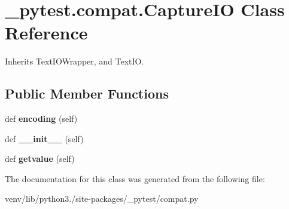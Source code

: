 \hypertarget{class__pytest_1_1compat_1_1_capture_i_o}{}\section{\+\_\+pytest.\+compat.\+Capture\+IO Class Reference}
\label{class__pytest_1_1compat_1_1_capture_i_o}


Inherits Text\+I\+O\+Wrapper, and Text\+IO.

\subsection*{Public Member Functions}
\begin{DoxyCompactItemize}
\item 
\mbox{\label{class__pytest_1_1compat_1_1_capture_i_o_aa5b773ce277fa3dbbabae4387d5d6e75}} 
def {\bfseries encoding} (self)
\item 
\mbox{\label{class__pytest_1_1compat_1_1_capture_i_o_a6636b919070398ff6c7182ad1b5702f5}} 
def {\bfseries \+\_\+\+\_\+init\+\_\+\+\_\+} (self)
\item 
\mbox{\label{class__pytest_1_1compat_1_1_capture_i_o_a47c828e1851710956189bf8cb35b9a47}} 
def {\bfseries getvalue} (self)
\end{DoxyCompactItemize}


The documentation for this class was generated from the following file\+:\begin{DoxyCompactItemize}
\item 
venv/lib/python3./site-\/packages/\+\_\+pytest/compat.\+py\end{DoxyCompactItemize}
